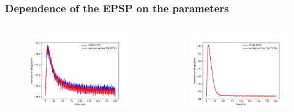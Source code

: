 \documentclass{beamer}
\begin{document}
\begin{frame}
	\frametitle{Dependence of the EPSP on the parameters}
	\begin{columns}
          	\begin{figure}
    				\centering
    				\includegraphics[width=\linewidth]{figures/epsp_fall_+.pdf}
 		   \end{figure}

          \begin{figure}
    				\centering
    				\includegraphics[width=\linewidth]{figures/epsp_fall_-.pdf}
 		   \end{figure}
	\end{columns}


\end{frame}
\end{document}
